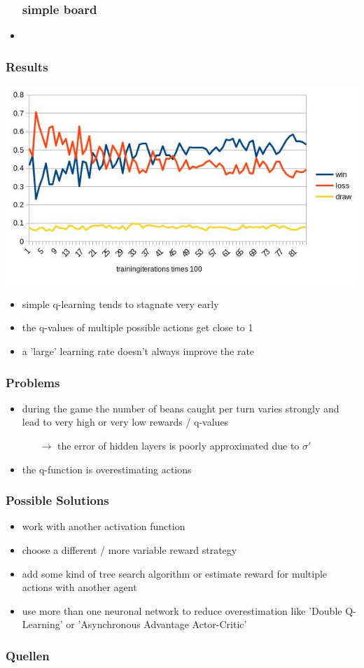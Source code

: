 \documentclass{beamer}
\begin{document}
\begin{frame}
\begin{itemize}
\frametitle{simple board}
\item 
\end{itemize}
\end{frame}

\begin{frame}
\frametitle{Results}
\includegraphics[scale=0.65]{gewinnrate.jpg}
\begin{itemize}
\item simple q-learning tends to stagnate very early
\item the q-values of multiple possible actions get close to 1
\item a 'large' learning rate doesn't always improve the rate 
\end{itemize}
\end{frame}

\begin{frame}
\frametitle{Problems}
\begin{itemize}
\item during the game the number of beans caught per turn varies strongly and lead to very high or very low rewards / q-values
\begin{itemize}
\item[$\rightarrow$] the error of hidden layers is poorly approximated due to $\sigma'$
\end{itemize}
\item the q-function is overestimating actions
\end{itemize}
\end{frame}

\begin{frame}
\frametitle{Possible Solutions}
\begin{itemize}
\item work with another activation function
\item choose a different / more variable reward strategy
\item add some kind of tree search algorithm or estimate reward for multiple actions with another agent
\item use more than one neuronal network to reduce overestimation like 'Double Q-Learning' or 'Asynchronous Advantage Actor-Critic' 
\end{itemize}
\end{frame}

\begin{frame}
\frametitle{Quellen}
\end{frame}
\end{document}
